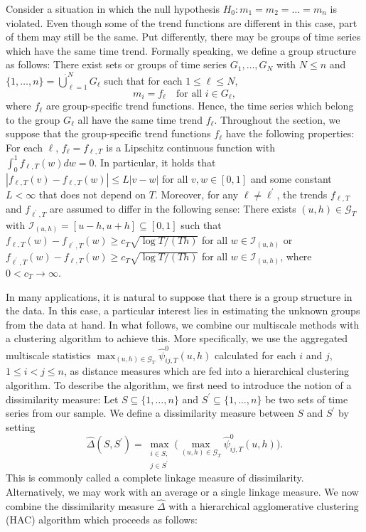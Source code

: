\documentclass[a4paper,12pt]{article}
\begin{document}
Consider a situation in which the null hypothesis $H_0: m_1 = m_2 = \ldots = m_n$ is violated. Even though some of the trend functions are different in this case, part of them may still be the same. Put differently, there may be groups of time series which have the same time trend. Formally speaking, we define a group structure as follows: There exist sets or groups of time series $G_1,\ldots,G_N$ with $N \le n$ and $\{1,\ldots,n\} = \mathbin{\dot{\bigcup}}_{\ell=1}^{N} G_\ell$ such that for each $1 \le \ell \le N$,
\[ m_i = f_\ell \quad \text{for all } i \in G_\ell, \]
where $f_\ell$ are group-specific trend functions. Hence, the time series which belong to the group $G_\ell$ all have the same time trend $f_\ell$. Throughout the section, we suppose that the group-specific trend functions $f_\ell$ have the following properties: For each $\ell$, $f_\ell = f_{\ell,T}$ is a Lipschitz continuous function with $\int_0^1 f_{\ell,T}(w) dw = 0$. In particular, it holds that $|f_{\ell,T}(v) - f_{\ell,T}(w)| \le L |v-w|$ for all $v,w \in [0,1]$ and some constant $L < \infty$ that does not depend on $T$. Moreover, for any $\ell \ne \ell^\prime$, the trends $f_{\ell,T}$ and $f_{\ell^\prime,T}$ are assumed to differ in the following sense: There exists $(u,h) \in \mathcal{G}_T$ with $\mathcal{I}_{(u, h)} = [u-h,u+h] \subseteq [0,1]$ such that $f_{\ell,T}(w) - f_{\ell^\prime,T}(w) \ge c_T \sqrt{\log T/(Th)}$ for all $w \in \mathcal{I}_{(u, h)}$ or $f_{\ell^\prime,T}(w) - f_{\ell,T}(w) \ge c_T \sqrt{\log T/(Th)}$ for all $w \in \mathcal{I}_{(u, h)}$, where $0 < c_T \rightarrow \infty$.


In many applications, it is natural to suppose that there is a group structure in the data. In this case, a particular interest lies in estimating the unknown groups from the data at hand. In what follows, we combine our multiscale methods with a clustering algorithm to achieve this. {\color{red}More specifically, we use the aggregated multiscale statistics $\max_{(u, h) \in \mathcal{G}_T}\hat{\psi}^0_{ij, T}(u, h)$ calculated for each $i$ and $j$, $1\leq i < j \leq n$,} as distance measures which are fed into a hierarchical clustering algorithm. To describe the algorithm, we first need to introduce the notion of a dissimilarity measure: Let $S \subseteq \{1,\ldots,n\}$ and $S^\prime \subseteq \{1,\ldots,n\}$ be two sets of time series from our sample. We define a dissimilarity measure between $S$ and $S^\prime$ by setting 
{\color{red}\begin{equation}\label{dissimilarity}
\widehat{\Delta}(S,S^\prime) = \max_{\substack{i \in S, \\ j \in S^\prime}} \Big(\max_{(u, h) \in \mathcal{G}_T}\hat{\psi}^0_{ij, T}(u, h)\Big). 
\end{equation}}
This is commonly called a complete linkage measure of dissimilarity. Alternatively, we may work with an average or a single linkage measure. We now combine the dissimilarity measure $\widehat{\Delta}$ with a hierarchical agglomerative clustering (HAC) algorithm which proceeds as follows: 
\vspace{10pt}
\end{document}
